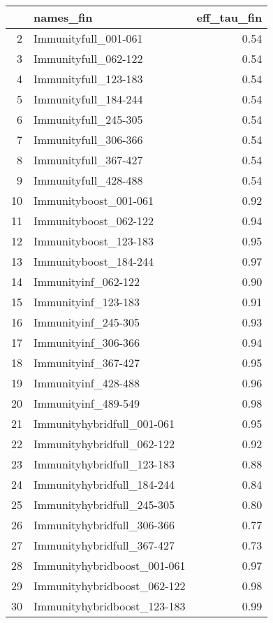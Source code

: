 \begin{table}[ht]
\centering
\begin{tabular}{rlr}
  \hline
 & names\_fin & eff\_tau\_fin \\ 
  \hline
2 & Immunityfull\_001-061 & 0.54 \\ 
  3 & Immunityfull\_062-122 & 0.54 \\ 
  4 & Immunityfull\_123-183 & 0.54 \\ 
  5 & Immunityfull\_184-244 & 0.54 \\ 
  6 & Immunityfull\_245-305 & 0.54 \\ 
  7 & Immunityfull\_306-366 & 0.54 \\ 
  8 & Immunityfull\_367-427 & 0.54 \\ 
  9 & Immunityfull\_428-488 & 0.54 \\ 
  10 & Immunityboost\_001-061 & 0.92 \\ 
  11 & Immunityboost\_062-122 & 0.94 \\ 
  12 & Immunityboost\_123-183 & 0.95 \\ 
  13 & Immunityboost\_184-244 & 0.97 \\ 
  14 & Immunityinf\_062-122 & 0.90 \\ 
  15 & Immunityinf\_123-183 & 0.91 \\ 
  16 & Immunityinf\_245-305 & 0.93 \\ 
  17 & Immunityinf\_306-366 & 0.94 \\ 
  18 & Immunityinf\_367-427 & 0.95 \\ 
  19 & Immunityinf\_428-488 & 0.96 \\ 
  20 & Immunityinf\_489-549 & 0.98 \\ 
  21 & Immunityhybridfull\_001-061 & 0.95 \\ 
  22 & Immunityhybridfull\_062-122 & 0.92 \\ 
  23 & Immunityhybridfull\_123-183 & 0.88 \\ 
  24 & Immunityhybridfull\_184-244 & 0.84 \\ 
  25 & Immunityhybridfull\_245-305 & 0.80 \\ 
  26 & Immunityhybridfull\_306-366 & 0.77 \\ 
  27 & Immunityhybridfull\_367-427 & 0.73 \\ 
  28 & Immunityhybridboost\_001-061 & 0.97 \\ 
  29 & Immunityhybridboost\_062-122 & 0.98 \\ 
  30 & Immunityhybridboost\_123-183 & 0.99 \\ 
   \hline
\end{tabular}
\end{table}
